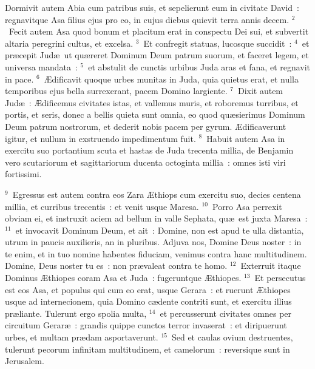 \bchapter
\lettrine[lines=3,image=true,loversize=0.05,lraise=-0.03]{D}{}ormivit autem Abia cum patribus suis, et sepelierunt eum in civitate David~: regnavitque Asa filius ejus pro eo, in cujus diebus quievit terra annis decem.
${}^{2}$~Fecit autem Asa quod bonum et placitum erat in conspectu Dei sui, et subvertit altaria peregrini cultus, et excelsa.
${}^{3}$~Et confregit statuas, lucosque succidit~:
${}^{4}$~et pr\ae cepit Jud\ae\ ut qu\ae reret Dominum Deum patrum suorum, et faceret legem, et universa mandata~:
${}^{5}$~et abstulit de cunctis urbibus Juda aras et fana, et regnavit in pace.
${}^{6}$~\AE dificavit quoque urbes munitas in Juda, quia quietus erat, et nulla temporibus ejus bella surrexerant, pacem Domino largiente.
${}^{7}$~Dixit autem Jud\ae~: \AE dificemus civitates istas, et vallemus muris, et roboremus turribus, et portis, et seris, donec a bellis quieta sunt omnia, eo quod qu\ae sierimus Dominum Deum patrum nostrorum, et dederit nobis pacem per gyrum. \AE dificaverunt igitur, et nullum in exstruendo impedimentum fuit.
${}^{8}$~Habuit autem Asa in exercitu suo portantium scuta et hastas de Juda trecenta millia, de Benjamin vero scutariorum et sagittariorum ducenta octoginta millia~: omnes isti viri fortissimi.


${}^{9}$~Egressus est autem contra eos Zara \AE thiops cum exercitu suo, decies centena millia, et curribus trecentis~: et venit usque Maresa.
${}^{10}$~Porro Asa perrexit obviam ei, et instruxit aciem ad bellum in valle Sephata, qu\ae\ est juxta Maresa~:
${}^{11}$~et invocavit Dominum Deum, et ait~: Domine, non est apud te ulla distantia, utrum in paucis auxilieris, an in pluribus. Adjuva nos, Domine Deus noster~: in te enim, et in tuo nomine habentes fiduciam, venimus contra hanc multitudinem. Domine, Deus noster tu es~: non pr\ae valeat contra te homo.
${}^{12}$~Exterruit itaque Dominus \AE thiopes coram Asa et Juda~: fugeruntque \AE thiopes.
${}^{13}$~Et persecutus est eos Asa, et populus qui cum eo erat, usque Gerara~: et ruerunt \AE thiopes usque ad internecionem, quia Domino c\ae dente contriti sunt, et exercitu illius pr\ae liante. Tulerunt ergo spolia multa,
${}^{14}$~et percusserunt civitates omnes per circuitum Gerar\ae~: grandis quippe cunctos terror invaserat~: et diripuerunt urbes, et multam pr\ae dam asportaverunt.
${}^{15}$~Sed et caulas ovium destruentes, tulerunt pecorum infinitam multitudinem, et camelorum~: reversique sunt in Jerusalem.

